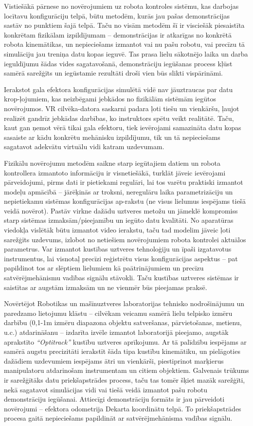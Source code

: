 \documentclass[12pt, a4paper]{article}
\numberwithin{equation}{section} %
\begin{document}
Vistiešākā pārnese no novērojumiem uz robota kontroles sistēmu, kas darbojas locītavu konfigurāciju telpā, būtu metodēm, kurās jau pašas demonstrācijas sastāv no punktiem šajā telpā. Taču no visām metodēm šī ir visciešāk piesaistīta konkrētam fizikālam izpildījumam -- demonstrācijas ir atkarīgas no konkrētā robota kinemātikas, un nepieciešams izmantot vai nu pašu robotu, vai precīzu tā simulāciju jau treniņa datu kopas ieguvē. Tas prasa lielu sākotnējo laika un darba ieguldījumu šādas vides sagatavošanā, demonstrāciju iegūšanas process kļūst samērā sarežģīts un iegūstamie rezultāti droši vien būs slikti vispārināmi.

Ierakstot gala efektora konfigurācijas simulētā vidē nav jāuztraucas par datu krop-ļojumiem, kas neizbēgami jebkādos no fizikālām sistēmām iegūtos novērojumos. VR cilvēka-datora saskarni padara ļoti tiešu un vienkāršu, ļaujot realizēt gandrīz jebkādas darbības, ko instruktors spētu veikt realitātē. Taču, kaut gan ņemot vērā tikai gala efektoru, tiek ievērojami samazināta datu kopas sasaiste ar kādu konkrētu mehānisku izpildījumu, tik un tā nepieciešams sagatavot adekvātu virtuālu vidi katram uzdevumam.

Fizikālu novērojumu metodēm saikne starp iegūtajiem datiem un robota kontrollera izmantoto informāciju ir visnetiešākā, turklāt jāveic ievērojami pārveidojumi, pirms dati ir pietiekami regulāri, lai tos varētu praktiski izmantot modeļu apmācībā -- jārēķinās ar troksni, neregulāru laika parametrizāciju un nepietiekamu sistēmas konfigurācijas ap-rakstu (ne visus lielumus iespējams tiešā veidā novērot). Pastāv virkne dažādu uztveres metožu un jāmeklē kompromiss starp sistēmas izmaksām/pieejamību un iegūto datu kvalitāti. No aparatūras viedokļa vislētāk būtu izmantot video ierakstu, taču tad modelim jāveic ļoti sarežģīts uzdevums, izlobot no netiešiem novērojumiem robota kontrolei aktuālos parametrus. Var izmantot kustības uztveres tehnoloģiju un īpaši izgatavotus instrumentus, lai visnotaļ precīzi reģistrētu visus konfigurācijas aspektus -- pat papildinot tos ar slēptiem lielumiem kā paātrinājumiem un precīzu satvērējmehānismu vadības signālu stāvokli. Taču kustības uztveres sistēmas ir saistītas ar augstām izmaksām un ne vienmēr būs pieejamas praksē.

Novērtējot Robotikas un mašīnuztveres laboratorijas tehnisko nodrošinājumu un paredzamo lietojumu klāstu -- cilvēkam veicamu samērā lielu telpisko izmēru darbību (0,1-1m izmēru diapazona objektu satveršanas, pārvietošanas, metienu, u.c.) atdarināšanu -- izdarīta izvēle izmantot laboratorijā pieejamo, augstāk aprakstīto \textit{``Optitrack''} kustību uztveres aprīkojumu. Ar tā palīdzību iespējams ar samērā augstu precizitāti ierakstīt šāda tipa kustību kinemātiku, un pielāgoties dažādiem uzdevumiem iespējams ātri un vienkārši, piestiprinot marķierus manipulatoru atdarinošam instrumentam un citiem objektiem. Galvenais trūkums ir sarežģītāks datu priekšapstrādes process, taču tas tomēr šķiet mazāk sarežģīti, nekā sagatavot simulācijas vidi vai tiešā veidā izmantot pašu robotu demonstrāciju iegūšanai. Attiecīgi demonstrāciju formāts ir jau pārveidoti novērojumi -- efektora odometrija Dekarta koordinātu telpā. To priekšapstrādes procesa gaitā nepieciešams papildināt ar satvērējmehānisma vadības signālu.
\end{document}
